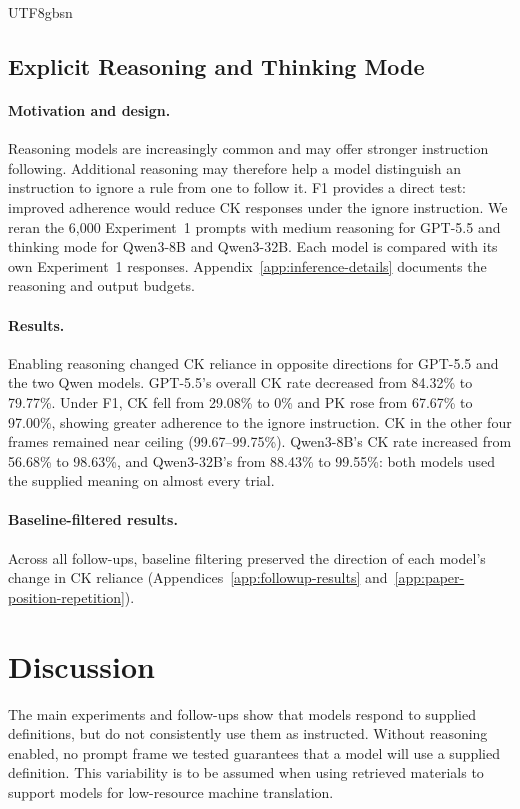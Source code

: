 \documentclass[11pt]{article}
\begin{document}
\begin{CJK*}{UTF8}{gbsn}
\subsection{Explicit Reasoning and Thinking Mode}
\label{sec:reasoning-followup}

\paragraph{Motivation and design.}
Reasoning models are increasingly common and may offer stronger instruction following. Additional reasoning may therefore help a model distinguish an instruction to ignore a rule from one to follow it. F1 provides a direct test: improved adherence would reduce CK responses under the ignore instruction. We reran the 6,000 Experiment~1 prompts with medium reasoning for GPT-5.5 and thinking mode for Qwen3-8B and Qwen3-32B. Each model is compared with its own Experiment~1 responses. Appendix~\ref{app:inference-details} documents the reasoning and output budgets.

\paragraph{Results.}
Enabling reasoning changed CK reliance in opposite directions for GPT-5.5 and the two Qwen models. GPT-5.5's overall CK rate decreased from 84.32\% to 79.77\%. Under F1, CK fell from 29.08\% to 0\% and PK rose from 67.67\% to 97.00\%, showing greater adherence to the ignore instruction. CK in the other four frames remained near ceiling (99.67--99.75\%). Qwen3-8B's CK rate increased from 56.68\% to 98.63\%, and Qwen3-32B's from 88.43\% to 99.55\%: both models used the supplied meaning on almost every trial.

\paragraph{Baseline-filtered results.}
Across all follow-ups, baseline filtering preserved the direction of each model's change in CK reliance (Appendices~\ref{app:followup-results} and~\ref{app:paper-position-repetition}).

\section{Discussion}
\label{sec:discussion}

The main experiments and follow-ups show that models respond to supplied definitions, but do not consistently use them as instructed. Without reasoning enabled, no prompt frame we tested guarantees that a model will use a supplied definition. This variability is to be assumed when using retrieved materials to support models for low-resource machine translation.



\end{CJK*}
\end{document}
